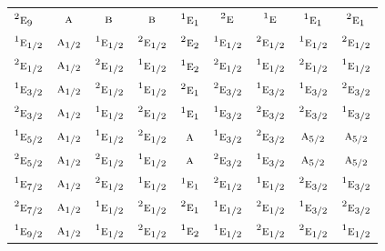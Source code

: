 \documentclass[10pt,a4paper]{article}
\numberwithin{equation}{section}
\newcommand{\irr}[1]{\text{\normalfont\scshape #1}}
\newcommand{\conjpair}[1]{{}^{#1}}
\begin{document}
{\begin{longtable}{@{}lcccccccc@{}}
$\conjpair{2}\irr{e}_{9}$ & $\irr{a}$ & $\irr{b}$ & $\irr{b}$ & $\conjpair{1}\irr{e}_{1}$ & $\conjpair{2}\irr{e}$ & $\conjpair{1}\irr{e}$ & $\conjpair{1}\irr{e}_{1}$ & $\conjpair{2}\irr{e}_{1}$\\
$\conjpair{1}\irr{e}_{1/2}$ & $\irr{a}_{1/2}$ & $\conjpair{1}\irr{e}_{1/2}$ & $\conjpair{2}\irr{e}_{1/2}$ & $\conjpair{2}\irr{e}_{2}$ & $\conjpair{1}\irr{e}_{1/2}$ & $\conjpair{2}\irr{e}_{1/2}$ & $\conjpair{1}\irr{e}_{1/2}$ & $\conjpair{2}\irr{e}_{1/2}$\\
$\conjpair{2}\irr{e}_{1/2}$ & $\irr{a}_{1/2}$ & $\conjpair{2}\irr{e}_{1/2}$ & $\conjpair{1}\irr{e}_{1/2}$ & $\conjpair{1}\irr{e}_{2}$ & $\conjpair{2}\irr{e}_{1/2}$ & $\conjpair{1}\irr{e}_{1/2}$ & $\conjpair{2}\irr{e}_{1/2}$ & $\conjpair{1}\irr{e}_{1/2}$\\
$\conjpair{1}\irr{e}_{3/2}$ & $\irr{a}_{1/2}$ & $\conjpair{2}\irr{e}_{1/2}$ & $\conjpair{1}\irr{e}_{1/2}$ & $\conjpair{2}\irr{e}_{1}$ & $\conjpair{2}\irr{e}_{3/2}$ & $\conjpair{1}\irr{e}_{3/2}$ & $\conjpair{1}\irr{e}_{3/2}$ & $\conjpair{2}\irr{e}_{3/2}$\\
$\conjpair{2}\irr{e}_{3/2}$ & $\irr{a}_{1/2}$ & $\conjpair{1}\irr{e}_{1/2}$ & $\conjpair{2}\irr{e}_{1/2}$ & $\conjpair{1}\irr{e}_{1}$ & $\conjpair{1}\irr{e}_{3/2}$ & $\conjpair{2}\irr{e}_{3/2}$ & $\conjpair{2}\irr{e}_{3/2}$ & $\conjpair{1}\irr{e}_{3/2}$\\
$\conjpair{1}\irr{e}_{5/2}$ & $\irr{a}_{1/2}$ & $\conjpair{1}\irr{e}_{1/2}$ & $\conjpair{2}\irr{e}_{1/2}$ & $\irr{a}$ & $\conjpair{1}\irr{e}_{3/2}$ & $\conjpair{2}\irr{e}_{3/2}$ & $\irr{a}_{5/2}$ & $\irr{a}_{5/2}$\\
$\conjpair{2}\irr{e}_{5/2}$ & $\irr{a}_{1/2}$ & $\conjpair{2}\irr{e}_{1/2}$ & $\conjpair{1}\irr{e}_{1/2}$ & $\irr{a}$ & $\conjpair{2}\irr{e}_{3/2}$ & $\conjpair{1}\irr{e}_{3/2}$ & $\irr{a}_{5/2}$ & $\irr{a}_{5/2}$\\
$\conjpair{1}\irr{e}_{7/2}$ & $\irr{a}_{1/2}$ & $\conjpair{2}\irr{e}_{1/2}$ & $\conjpair{1}\irr{e}_{1/2}$ & $\conjpair{1}\irr{e}_{1}$ & $\conjpair{2}\irr{e}_{1/2}$ & $\conjpair{1}\irr{e}_{1/2}$ & $\conjpair{2}\irr{e}_{3/2}$ & $\conjpair{1}\irr{e}_{3/2}$\\
$\conjpair{2}\irr{e}_{7/2}$ & $\irr{a}_{1/2}$ & $\conjpair{1}\irr{e}_{1/2}$ & $\conjpair{2}\irr{e}_{1/2}$ & $\conjpair{2}\irr{e}_{1}$ & $\conjpair{1}\irr{e}_{1/2}$ & $\conjpair{2}\irr{e}_{1/2}$ & $\conjpair{1}\irr{e}_{3/2}$ & $\conjpair{2}\irr{e}_{3/2}$\\
$\conjpair{1}\irr{e}_{9/2}$ & $\irr{a}_{1/2}$ & $\conjpair{1}\irr{e}_{1/2}$ & $\conjpair{2}\irr{e}_{1/2}$ & $\conjpair{1}\irr{e}_{2}$ & $\conjpair{1}\irr{e}_{1/2}$ & $\conjpair{2}\irr{e}_{1/2}$ & $\conjpair{2}\irr{e}_{1/2}$ & $\conjpair{1}\irr{e}_{1/2}$\\

\end{longtable}}
\end{document}
